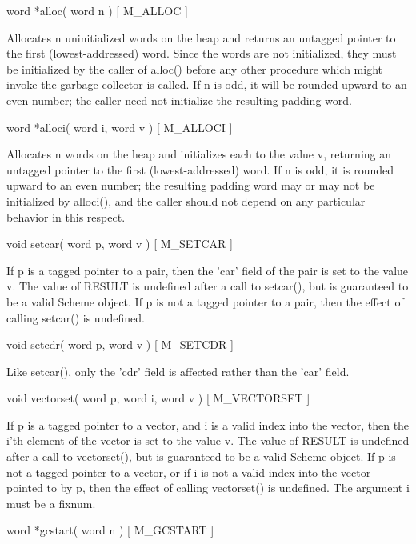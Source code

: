 \begin{description}

\item {word *alloc( word n ) \hfill [ M\_ALLOC ]}

Allocates n uninitialized words on the heap and returns an untagged
pointer to the first (lowest-addressed) word. Since the words are not
initialized, they must be initialized by the caller of alloc() before
any other procedure which might invoke the garbage collector is
called. If n is odd, it will be rounded upward to an even number; the 
caller need not initialize the resulting padding word.

\item {word *alloci( word i, word v ) \hfill [ M\_ALLOCI ] }

Allocates n words on the heap and initializes each to the value v,
returning an untagged pointer to the first (lowest-addressed) word.
If n is odd, it is rounded upward to an even number; the resulting
padding word may or may not be initialized by alloci(), and the caller
should not depend on any particular behavior in this respect.

\item {void setcar( word p, word v ) \hfill [ M\_SETCAR ] }

If p is a tagged pointer to a pair, then the 'car' field of the pair is
set to the value v. The value of RESULT is undefined after a call to 
setcar(), but is guaranteed to be a valid Scheme object. If p is not
a tagged pointer to a pair, then the effect of calling setcar() is 
undefined.

\item {void setcdr( word p, word v ) \hfill [ M\_SETCDR ] }

Like setcar(), only the 'cdr' field is affected rather than the 'car' field.

\item {void vectorset( word p, word i, word v ) \hfill [ M\_VECTORSET ]}

If p is a tagged pointer to a vector, and i is a valid index into the 
vector, then the i'th element of the vector is set to the value v. The 
value of RESULT is undefined after a call to vectorset(), but is guaranteed 
to be a valid Scheme object. If p is not a tagged pointer to a vector, or
if i is not a valid index into the vector pointed to by p, then the effect
of calling vectorset() is undefined. The argument i must be a fixnum.

\item {word *gcstart( word n ) \hfill [ M\_GCSTART ] }


\end{description}
